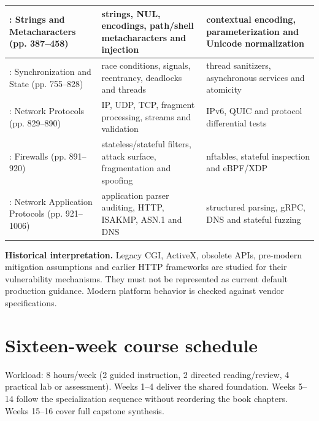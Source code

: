 \documentclass[10pt,letterpaper]{article}
\begin{document}
\begin{longtable}{>{\raggedright\arraybackslash}p{}>{\raggedright\arraybackslash}p{}>{\raggedright\arraybackslash}p{}}
8: Strings and Metacharacters (pp. 387--458) & strings, NUL, encodings, path/shell metacharacters and injection & contextual encoding, parameterization and Unicode normalization\\\midrule
13: Synchronization and State (pp. 755--828) & race conditions, signals, reentrancy, deadlocks and threads & thread sanitizers, asynchronous services and atomicity\\\midrule
14: Network Protocols (pp. 829--890) & IP, UDP, TCP, fragment processing, streams and validation & IPv6, QUIC and protocol differential tests\\\midrule
15: Firewalls (pp. 891--920) & stateless/stateful filters, attack surface, fragmentation and spoofing & nftables, stateful inspection and eBPF/XDP\\\midrule
16: Network Application Protocols (pp. 921--1006) & application parser auditing, HTTP, ISAKMP, ASN.1 and DNS & structured parsing, gRPC, DNS and stateful fuzzing\\\midrule
\bottomrule\end{longtable}\endgroup
\begin{historynote}\textbf{Historical interpretation.} Legacy CGI, ActiveX, obsolete APIs, pre-modern mitigation assumptions and earlier HTTP frameworks are studied for their vulnerability mechanisms. They must not be represented as current default production guidance. Modern platform behavior is checked against vendor specifications.\end{historynote}
\section{Sixteen-week course schedule}
Workload: 8 hours/week (2 guided instruction, 2 directed reading/review, 4 practical lab or assessment). Weeks 1--4 deliver the shared foundation. Weeks 5--14 follow the specialization sequence without reordering the book chapters. Weeks 15--16 cover full capstone synthesis.
\end{document}
